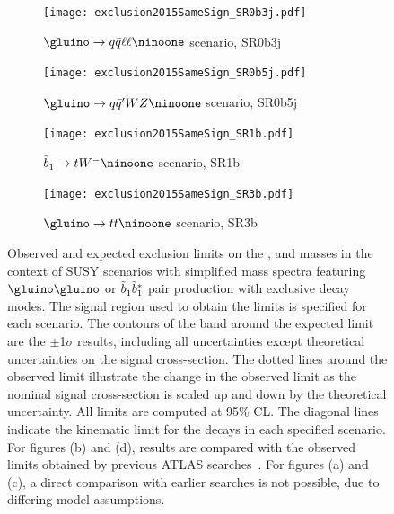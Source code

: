\begin{figure}[htb!]
\centering
\begin{subfigure}[t]{0.49\textwidth}\texttt{[image: exclusion2015SameSign\_SR0b3j.pdf]}
\caption{$\gluino\to q\bar q \ell\ell\ninoone$ scenario, SR0b3j}\label{fig:limits_SR0b3j}\end{subfigure}
\begin{subfigure}[t]{0.49\textwidth}\texttt{[image: exclusion2015SameSign\_SR0b5j.pdf]}
\caption{$\gluino\to q\bar q' WZ\ninoone$ scenario, SR0b5j}\label{fig:limits_SR0b5j}\end{subfigure}
\par\bigskip
\begin{subfigure}[t]{0.49\textwidth}\texttt{[image: exclusion2015SameSign\_SR1b.pdf]}
\caption{$\sbottomone\to tW^-\ninoone$ scenario, SR1b}\label{fig:limits_SR1b}\end{subfigure}
\begin{subfigure}[t]{0.49\textwidth}\texttt{[image: exclusion2015SameSign\_SR3b.pdf]}
\caption{$\gluino\to t\bar t\ninoone$ scenario, SR3b}\label{fig:limits_SR3b}\end{subfigure}
\caption{
Observed and expected exclusion limits on the \gluino, \sbottomone and \ninoone masses 
in the context of SUSY scenarios with simplified mass spectra 
featuring $\gluino\gluino$ or $\tilde{b}^{}_1\tilde{b}^{*}_1$ pair production with exclusive decay modes. 
The signal region used to obtain the limits is specified for each scenario. 
The contours of the band around the expected limit are the $\pm$1$\sigma$ results, 
  including all uncertainties except theoretical uncertainties on the signal cross-section. The dotted lines around the observed
    limit illustrate the change in the observed limit as the nominal signal cross-section is scaled up and down
    by the theoretical uncertainty. All limits are computed at 95\% CL. 
    The diagonal lines indicate the kinematic limit for the decays in each specified scenario.  
For figures (b) and (d), results are compared with the observed limits obtained by previous ATLAS searches~\cite{paperSS3L,Aad:2015iea,Aad:2015pfx}. 
For figures (a) and (c), a direct comparison with earlier searches is not possible, due to differing model assumptions. 
}
\label{fig:Results_Limits} 
\end{figure} 

